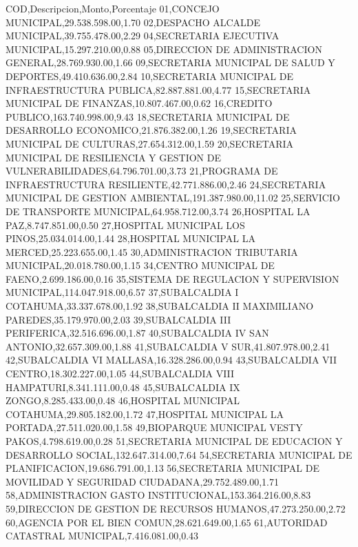 COD,Descripcion,Monto,Porcentaje
01,CONCEJO MUNICIPAL,29.538.598.00,1.70
02,DESPACHO ALCALDE MUNICIPAL,39.755.478.00,2.29
04,SECRETARIA EJECUTIVA MUNICIPAL,15.297.210.00,0.88
05,DIRECCION DE ADMINISTRACION GENERAL,28.769.930.00,1.66
09,SECRETARIA MUNICIPAL DE SALUD Y DEPORTES,49.410.636.00,2.84
10,SECRETARIA MUNICIPAL DE INFRAESTRUCTURA PUBLICA,82.887.881.00,4.77
15,SECRETARIA MUNICIPAL DE FINANZAS,10.807.467.00,0.62
16,CREDITO PUBLICO,163.740.998.00,9.43
18,SECRETARIA MUNICIPAL DE DESARROLLO ECONOMICO,21.876.382.00,1.26
19,SECRETARIA MUNICIPAL DE CULTURAS,27.654.312.00,1.59
20,SECRETARIA MUNICIPAL DE RESILIENCIA Y GESTION DE VULNERABILIDADES,64.796.701.00,3.73
21,PROGRAMA DE INFRAESTRUCTURA RESILIENTE,42.771.886.00,2.46
24,SECRETARIA MUNICIPAL DE GESTION AMBIENTAL,191.387.980.00,11.02
25,SERVICIO DE TRANSPORTE MUNICIPAL,64.958.712.00,3.74
26,HOSPITAL LA PAZ,8.747.851.00,0.50
27,HOSPITAL MUNICIPAL LOS PINOS,25.034.014.00,1.44
28,HOSPITAL MUNICIPAL LA MERCED,25.223.655.00,1.45
30,ADMINISTRACION TRIBUTARIA MUNICIPAL,20.018.780.00,1.15
34,CENTRO MUNICIPAL DE FAENO,2.699.186.00,0.16
35,SISTEMA DE REGULACION Y SUPERVISION MUNICIPAL,114.047.918.00,6.57
37,SUBALCALDIA I COTAHUMA,33.337.678.00,1.92
38,SUBALCALDIA II MAXIMILIANO PAREDES,35.179.970.00,2.03
39,SUBALCALDIA III PERIFERICA,32.516.696.00,1.87
40,SUBALCALDIA IV SAN ANTONIO,32.657.309.00,1.88
41,SUBALCALDIA V SUR,41.807.978.00,2.41
42,SUBALCALDIA VI MALLASA,16.328.286.00,0.94
43,SUBALCALDIA VII CENTRO,18.302.227.00,1.05
44,SUBALCALDIA VIII HAMPATURI,8.341.111.00,0.48
45,SUBALCALDIA IX ZONGO,8.285.433.00,0.48
46,HOSPITAL MUNICIPAL COTAHUMA,29.805.182.00,1.72
47,HOSPITAL MUNICIPAL LA PORTADA,27.511.020.00,1.58
49,BIOPARQUE MUNICIPAL VESTY PAKOS,4.798.619.00,0.28
51,SECRETARIA MUNICIPAL DE EDUCACION Y DESARROLLO SOCIAL,132.647.314.00,7.64
54,SECRETARIA MUNICIPAL DE PLANIFICACION,19.686.791.00,1.13
56,SECRETARIA MUNICIPAL DE MOVILIDAD Y SEGURIDAD CIUDADANA,29.752.489.00,1.71
58,ADMINISTRACION GASTO INSTITUCIONAL,153.364.216.00,8.83
59,DIRECCION DE GESTION DE RECURSOS HUMANOS,47.273.250.00,2.72
60,AGENCIA POR EL BIEN COMUN,28.621.649.00,1.65
61,AUTORIDAD CATASTRAL MUNICIPAL,7.416.081.00,0.43
